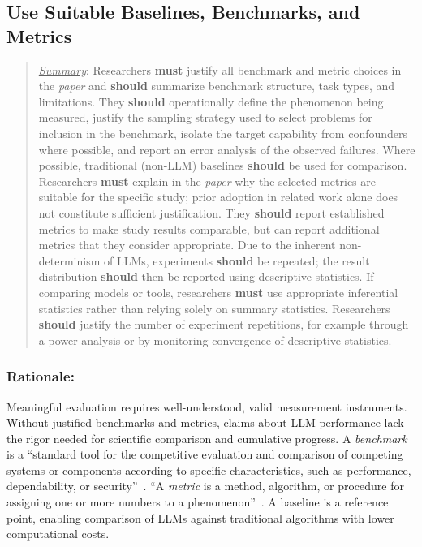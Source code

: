 \documentclass[smallextended]{svjour3}
\newcommand{\must}{\textbf{must}\xspace}
\newcommand{\should}{\textbf{should}\xspace}
\newcommand{\summary}{\underline{\emph{Summary}}\xspace}
\newcommand{\summary}{\textbf{\emph{Summary}}\xspace}
\newcommand{\paper}{\emph{paper}\xspace}
\newcommand{\paper}{\emph{paper}\xspace}
\newenvironment{framed}{\begin{quote}}{\end{quote}}
\newcommand{\guidelinesubsubsection}[1]{\subsubsection{\bfseries #1:}}
\newcommand{\guidelinesubsubsection}[1]{\subsubsection{#1}}
\begin{document}
\subsection{Use Suitable Baselines, Benchmarks, and Metrics}
\label{sec:use-suitable-baselines-benchmarks-and-metrics}

\vspace{0.5\baselineskip}
\begin{framed}
\summary: Researchers \must justify all benchmark and metric choices in the \paper and \should summarize benchmark structure, task types, and limitations. They \should operationally define the phenomenon being measured, justify the sampling strategy used to select problems for inclusion in the benchmark, isolate the target capability from confounders where possible, and report an error analysis of the observed failures. Where possible, traditional (non-LLM) baselines \should be used for comparison. Researchers \must explain in the \paper why the selected metrics are suitable for the specific study; prior adoption in related work alone does not constitute sufficient justification. They \should report established metrics to make study results comparable, but can report additional metrics that they consider appropriate. Due to the inherent non-determinism of LLMs, experiments \should be repeated; the result distribution \should then be reported using descriptive statistics. If comparing models or tools, researchers \must use appropriate inferential statistics rather than relying solely on summary statistics. Researchers \should justify the number of experiment repetitions, for example through a power analysis or by monitoring convergence of descriptive statistics. \end{framed}

\guidelinesubsubsection{Rationale}

Meaningful evaluation requires well-understood, valid measurement instruments.
Without justified benchmarks and metrics, claims about LLM performance lack the rigor needed for scientific comparison and cumulative progress.
A \textit{benchmark} is a ``standard tool for the competitive evaluation and comparison of competing systems or components according to specific characteristics, such as performance, dependability, or security''~\cite{DBLP:conf/wosp/KistowskiAHLHC15}. ``A \textit{metric} is a method, algorithm, or procedure for assigning one or more numbers to a phenomenon''~\cite{DBLP:books/sp/24/RalphKAA24}. A baseline is a reference point, enabling comparison of LLMs against traditional algorithms with lower computational costs.
\end{document}
